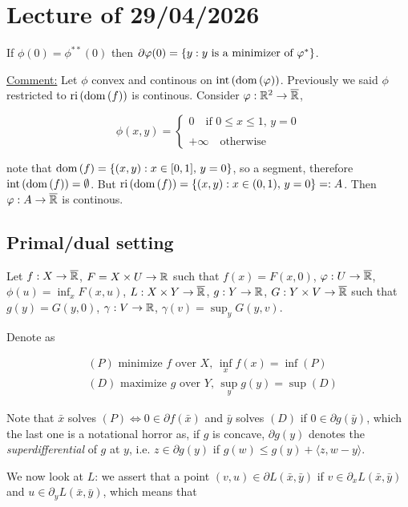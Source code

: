 \chapter{Lecture \thechapter{} of 29/04/2026}

If $\phi(0) = \phi^{**}(0)$ then $\partial\varphi(0) = \left\{ y : y \text{ is a minimizer of } \varphi^* \right\}$. 

\underline{Comment:} Let $\phi$ convex and continous on $\mathrm{int}\left(\mathrm{dom}\left(\varphi\right)\right)$. Previously we said $\phi$ restricted to $\mathrm{ri}\left(\mathrm{dom}\left(f\right)\right)$ is continous. Consider $\varphi : \mathbb{R}^2 \to \overline{\mathbb{R}}$, 

\[ \phi(x,y )= 
    \begin{cases}
        0 \quad \text{if } 0 \le x \le 1,\, y = 0 \\
        \\
        +\infty \quad \text{otherwise}
    \end{cases}
\]

note that $\mathrm{dom}\left(f\right) = \left\{ (x,y) : x \in [0,1],\, y = 0 \right\}$, so a segment, therefore $\mathrm{int}\left(\mathrm{dom}\left(f\right)\right) = \emptyset$. But $\mathrm{ri}\left(\mathrm{dom}\left(f\right)\right) = \left\{ (x,y) : x \in (0,1),\, y=0 \right\} =: A$. Then $\varphi : A \to \overline{\mathbb{R}}$ is continous.

\section{Primal/dual setting}

Let $f : X \to \overline{\mathbb{R}}$, $F = X \times U \to \mathbb{R}$ such that $f(x) = F(x,0)$, $\varphi : U \to \overline{\mathbb{R}}$, $\phi(u) = \inf_x F(x,u)$, $L : X \times Y \to \overline{\mathbb{R}}$, $g : Y \to \mathbb{R}$, $G : Y \times V \to \overline{\mathbb{R}}$ such that $g(y) = G(y,0)$, $\gamma : V \to \mathbb{R}$, $\gamma(v) = \sup_y G(y,v)$. 

Denote as 

\begin{align*}
    &(P) \text{ minimize } f \text{ over } X,\, \inf_x f(x) = \inf(P) \\
    &(D) \text{ maximize } g \text{ over } Y,\, \sup_y g(y) = \sup(D)
\end{align*}

Note that $\bar{x}$ solves $(P) \iff 0 \in \partial f(\bar{x})$ and $\bar{y}$ solves $(D)$ if $0 \in \partial g(\bar{y})$, which the last one is a notational horror as, if $g$ is concave, $\partial g(y)$ denotes the \emph{superdifferential} of $g$ at $y$, i.e. $z \in \partial g(y)$ if $g(w) \le g(y) + \langle z, w-y \rangle$.

We now look at $L$: we assert that a point $(v,u) \in \partial L(\bar{x},\bar{y})$ if $v \in \partial_x L(\bar{x},\bar{y})$ and $u \in \partial_y L(\bar{x},\bar{y})$, which means that 

